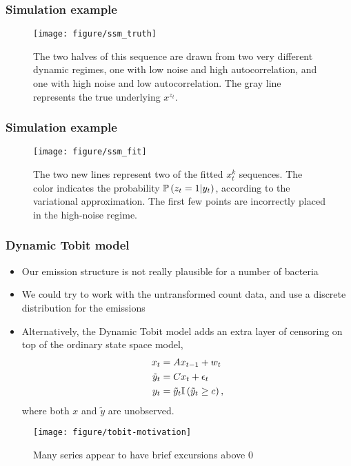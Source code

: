 \documentclass{beamer}
\begin{document}
\begin{frame}
  \frametitle{Simulation example}
\begin{figure}[ht]
  \centering
  \texttt{[image: figure/ssm\_truth]}
  \caption{The two halves of this sequence are drawn from two very different
    dynamic regimes, one with low noise and high autocorrelation, and one with
    high noise and low autocorrelation. The gray line represents the true
    underlying $x^{z_{t}}$. \label{fig:ssm_truth} }
\end{figure}
\end{frame}

\begin{frame}
  \frametitle{Simulation example}
\begin{figure}[ht]
  \centering
  \texttt{[image: figure/ssm\_fit]}
  \caption{The two new lines represent two of the fitted $x_{t}^{k}$ sequences.
    The color indicates the probability $\mathbb{P}\left({z_{t} = 1 \vert y_{t}}\right)$,
      according to the variational approximation. The first few points are
      incorrectly placed in the high-noise regime.\label{fig:ssm_truth} }
\end{figure}
\end{frame}

\begin{frame}
  \frametitle{Dynamic Tobit model}
 \begin{itemize}
 \item Our emission structure is not really plausible for a number of bacteria
 \item We could try to work with the untransformed count data, and use a
   discrete distribution for the emissions
  \item Alternatively, the Dynamic Tobit model adds an extra layer of censoring
    on top of the ordinary state space model,
    \begin{align*}
      x_{t} &= Ax_{t - 1} + w_{t} \\
      \tilde{y}_{t} &= Cx_{t} + \epsilon_{t} \\
      y_{t} &= \tilde{y}_{t} \mathbb{I}\left({\tilde{y}_{t} \geq c}\right),
    \end{align*}
    where both $x$ and $\tilde{y}$ are unobserved.
 \end{itemize} 
\begin{figure}[ht]
  \centering
  \texttt{[image: figure/tobit-motivation]}
  \caption{Many series appear to have brief excursions above 0 \label{fig:label}}
\end{figure}
\end{frame}
\end{document}
